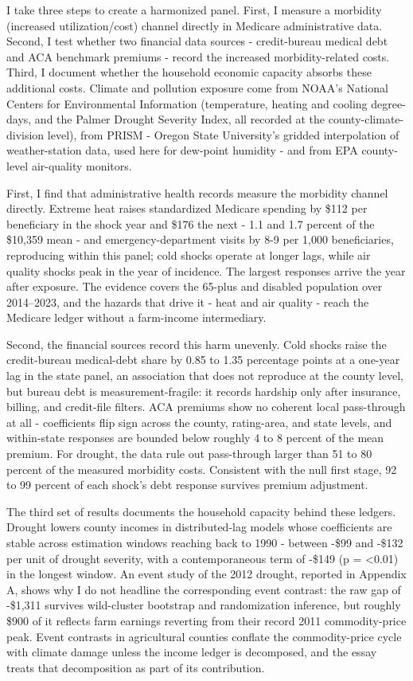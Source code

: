 \documentclass[a4paper,11pt]{report}
\begin{document}
I take three steps to create a harmonized panel. First, I measure a morbidity (increased utilization/cost) channel directly in Medicare administrative data. Second, I test whether two financial data sources - credit-bureau medical debt and ACA benchmark premiums - record the increased morbidity-related costs. Third, I document whether the household economic capacity absorbs these additional costs. Climate and pollution exposure come from NOAA's National Centers for Environmental Information (temperature, heating and cooling degree-days, and the Palmer Drought Severity Index, all recorded at the county-climate-division level), from PRISM - Oregon State University's gridded interpolation of weather-station data, used here for dew-point humidity - and from EPA county-level air-quality monitors.

First, I find that administrative health records measure the morbidity channel directly. Extreme heat raises standardized Medicare spending by \$112 per beneficiary in the shock year and \$176 the next - 1.1 and 1.7 percent of the \$10,359 mean - and emergency-department visits by 8-9 per 1,000 beneficiaries, reproducing \citet{deryugina2019mortality} within this panel; cold shocks operate at longer lags, while air quality shocks peak in the year of incidence. The largest responses arrive the year after exposure. The evidence covers the 65-plus and disabled population over 2014--2023, and the hazards that drive it - heat and air quality - reach the Medicare ledger without a farm-income intermediary.

Second, the financial sources record this harm unevenly. Cold shocks raise the credit-bureau medical-debt share by 0.85 to 1.35 percentage points at a one-year lag in the state panel, an association that does not reproduce at the county level, but bureau debt is measurement-fragile: it records hardship only after insurance, billing, and credit-file filters. ACA premiums show no coherent local pass-through at all - coefficients flip sign across the county, rating-area, and state levels, and within-state responses are bounded below roughly 4 to 8 percent of the mean premium. For drought, the data rule out pass-through larger than 51 to 80 percent of the measured morbidity costs. Consistent with the null first stage, 92 to 99 percent of each shock's debt response survives premium adjustment.

The third set of results documents the household capacity behind these ledgers. Drought lowers county incomes in distributed-lag models whose coefficients are stable across estimation windows reaching back to 1990 - between -\$99 and -\$132 per unit of drought severity, with a contemporaneous term of -\$149 (p = <0.01) in the longest window. An event study of the 2012 drought, reported in Appendix A, shows why I do not headline the corresponding event contrast: the raw gap of -\$1,311 survives wild-cluster bootstrap and randomization inference, but roughly \$900 of it reflects farm earnings reverting from their record 2011 commodity-price peak. Event contrasts in agricultural counties conflate the commodity-price cycle with climate damage unless the income ledger is decomposed, and the essay treats that decomposition as part of its contribution.
\end{document}

